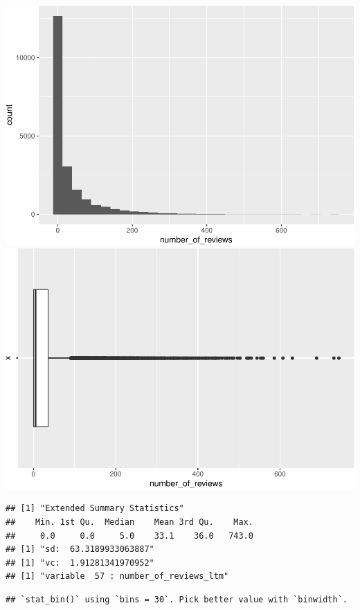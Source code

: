 \includegraphics{anal_files/figure-latex/unnamed-chunk-9-36.pdf}
\includegraphics{anal_files/figure-latex/unnamed-chunk-9-37.pdf}

\begin{verbatim}
## [1] "Extended Summary Statistics"
##    Min. 1st Qu.  Median    Mean 3rd Qu.    Max. 
##     0.0     0.0     5.0    33.1    36.0   743.0 
## [1] "sd:  63.3189933063887"
## [1] "vc:  1.91281341970952"
## [1] "variable  57 : number_of_reviews_ltm"
\end{verbatim}

\begin{verbatim}
## `stat_bin()` using `bins = 30`. Pick better value with `binwidth`.
\end{verbatim}

